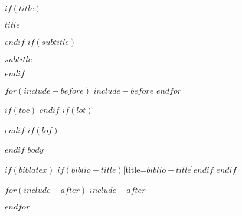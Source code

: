 \documentclass[12pt]{$documentclass$}
\begin{document}
$if(title)${\fontsize{22}{26.4}\selectfont \textbf{$title$} \par}$endif$
$if(subtitle)${\fontsize{20}{24}\selectfont \textbf{$subtitle$} \par}$endif$



$for(include-before)$
$include-before$
$endfor$


$if(toc)$
{
\hypersetup{linkcolor=black}
\setcounter{tocdepth}{$toc-depth$}
\tableofcontents
}
$endif$
$if(lot)$
\listoftables
$endif$
$if(lof)$
\listoffigures
$endif$
$body$


$if(biblatex)$
\printbibliography$if(biblio-title)$[title=$biblio-title$]$endif$
$endif$

$for(include-after)$
$include-after$

$endfor$
\end{document}
